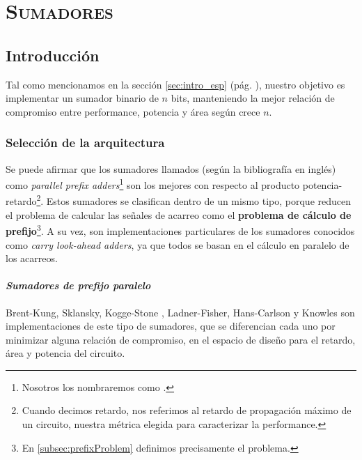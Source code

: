 



\chapter{ \textsc{ Sumadores } }\label{diseñoDigital}
	
\section{Introducción}
Tal como mencionamos en la sección \ref{sec:intro_esp} (pág. \pageref{sec:intro_esp}), nuestro objetivo es implementar un sumador binario de $n$ bits, manteniendo la mejor relación de compromiso entre performance, potencia y área según crece \(n\).


\subsection{Selección de la arquitectura}\label{sec:selección_arquitectura}

Se puede afirmar que los sumadores llamados (según la bibliografía en inglés) como \emph{parallel prefix adders}\footnote{Nosotros los nombraremos como .} son los mejores con respecto al producto potencia-retardo\footnote{Cuando decimos retardo, nos referimos al retardo de propagación máximo de un circuito, nuestra métrica elegida para caracterizar la performance.}.  Estos sumadores se clasifican dentro de un mismo tipo, porque reducen el problema de calcular las señales de acarreo como el \textbf{problema de cálculo de prefijo}\footnote{En \ref{subsec:prefixProblem} definimos precisamente el problema.}. A su vez, son implementaciones particulares de los sumadores  conocidos como \emph{carry look-ahead adders}, ya que todos se basan en el cálculo en paralelo de los acarreos.
\subsubsection{\emph{Sumadores de prefijo paralelo}}
Brent-Kung\cite{brent-kung}, Sklansky\cite{sklansky}, Kogge-Stone \cite{kogge-stone}, Ladner-Fisher\cite{ladner-fischer}, Hans-Carlson\cite{kogge-stone} y Knowles\cite{knowles} son implementaciones de este tipo de sumadores, que se diferencian cada uno por minimizar alguna relación de compromiso, en el espacio de diseño para el retardo, área y potencia\cite{Sugla-Carlson} del circuito.

